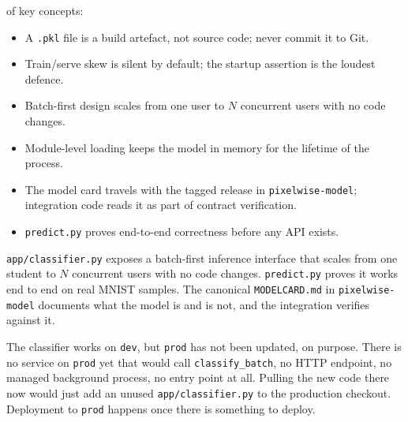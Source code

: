  of key concepts:
\begin{itemize}
    \item A \texttt{.pkl} file is a build artefact, not source code; never commit it to Git.
    \item Train/serve skew is silent by default; the startup assertion is the loudest defence.
    \item Batch-first design scales from one user to $N$ concurrent users with no code changes.
    \item Module-level loading keeps the model in memory for the lifetime of the process.
    \item The model card travels with the tagged release in \texttt{pixelwise-model}; integration code reads it as part of contract verification.
    \item \texttt{predict.py} proves end-to-end correctness before any API exists.
\end{itemize}



 \texttt{app/classifier.py} exposes a batch-first
inference interface that scales from one student to $N$ concurrent users
with no code changes.
\texttt{predict.py} proves it works end to end on real MNIST samples.
The canonical \texttt{MODELCARD.md} in \texttt{pixelwise-model} documents
what the model is and is not, and the integration verifies against it.

The classifier works on \texttt{dev}, but \texttt{prod} has not been
updated, on purpose. There is no service on \texttt{prod} yet that would
call \texttt{classify\_batch}, no HTTP endpoint, no managed background
process, no entry point at all. Pulling the new code there now would
just add an unused \texttt{app/classifier.py} to the production checkout.
Deployment to \texttt{prod} happens once there is something to deploy.
